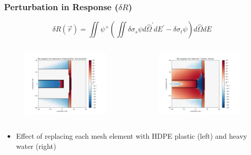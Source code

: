 \documentclass[t]{beamer}
\begin{document}
\begin{frame}
  \frametitle{Perturbation in Response ($\delta R$)}
  \vskip-0.25in
  \begin{equation*}
    \delta R\left(\vec{r}\right) = \iint\psi^+\left(\iint\delta\sigma_s\psi d\hat{\Omega}^\prime dE^\prime - \delta\sigma_t\psi\right)d\hat{\Omega}dE
  \end{equation*}
  \vskip-0.25in
  \begin{columns}
    \begin{figure}
      \includegraphics[trim={0.7in 0.15in 1.05in 0.4in},clip,scale=0.36]{images/dR_angular_06.png}
    \end{figure}
    \begin{figure}
      \includegraphics[trim={0.7in 0.15in 1.05in 0.4in},clip,scale=0.36]{images/dR_angular_07.png}
    \end{figure}
  \end{columns}
  \begin{itemize}
    \item Effect of replacing each mesh element with HDPE plastic (left) and
          heavy water (right)
  \end{itemize}
\end{frame}
\end{document}
